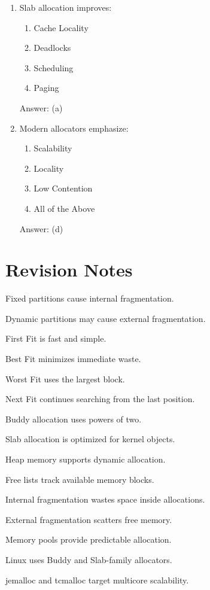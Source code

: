 \begin{enumerate}
\item Slab allocation improves:
\begin{enumerate}[label=(\alph*)]
\item Cache Locality
\item Deadlocks
\item Scheduling
\item Paging
\end{enumerate}
Answer: (a)

\item Modern allocators emphasize:
\begin{enumerate}[label=(\alph*)]
\item Scalability
\item Locality
\item Low Contention
\item All of the Above
\end{enumerate}
Answer: (d)
\end{enumerate}

\section{Revision Notes}

\begin{revisionnotes}
\item Fixed partitions cause internal fragmentation.
\item Dynamic partitions may cause external fragmentation.
\item First Fit is fast and simple.
\item Best Fit minimizes immediate waste.
\item Worst Fit uses the largest block.
\item Next Fit continues searching from the last position.
\item Buddy allocation uses powers of two.
\item Slab allocation is optimized for kernel objects.
\item Heap memory supports dynamic allocation.
\item Free lists track available memory blocks.
\item Internal fragmentation wastes space inside allocations.
\item External fragmentation scatters free memory.
\item Memory pools provide predictable allocation.
\item Linux uses Buddy and Slab-family allocators.
\item jemalloc and tcmalloc target multicore scalability.
\end{revisionnotes}

